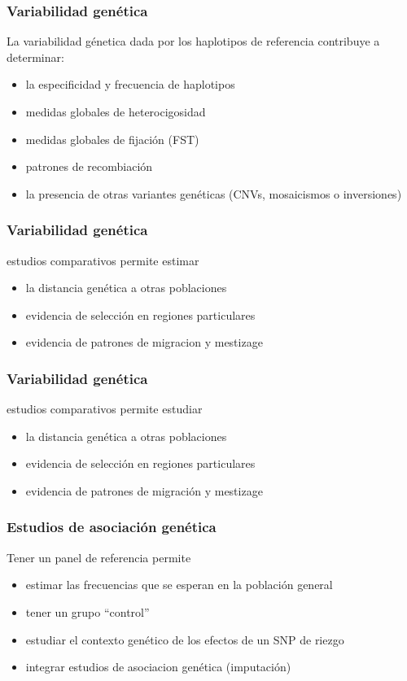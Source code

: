 \documentclass{beamer}\usepackage[]{graphicx}\usepackage[]{color}
\begin{document}
\begin{frame}[fragile]
\frametitle{Variabilidad gen\'etica}

La variabilidad g\'enetica dada por los haplotipos de referencia contribuye a determinar:

\begin{itemize}
\item la especificidad y frecuencia de haplotipos 
\item medidas globales de heterocigosidad 
\item medidas globales de fijaci\'on (FST)
\item patrones de recombiaci\'on
\item la presencia de otras variantes gen\'eticas (CNVs, mosaicismos o inversiones)
\end{itemize}
\end{frame}


\begin{frame}[fragile]
\frametitle{Variabilidad gen\'etica}
estudios comparativos permite estimar
\begin{itemize}
\item la distancia gen\'etica a otras poblaciones 
\item evidencia de selecci\'on en regiones particulares
\item evidencia de patrones de migracion y mestizage
\end{itemize}
\end{frame}


\begin{frame}[fragile]
\frametitle{Variabilidad gen\'etica}
estudios comparativos permite estudiar
\begin{itemize}
\item la distancia gen\'etica a otras poblaciones 
\item evidencia de selecci\'on en regiones particulares
\item evidencia de patrones de migraci\'on y mestizage
\end{itemize}
\end{frame}



\begin{frame}[fragile]
\frametitle{Estudios de asociaci\'on gen\'etica}
Tener un panel de referencia permite
\begin{itemize}
\item estimar las frecuencias que se esperan en la poblaci\'on general 
\item tener un grupo ``control''
\item estudiar el contexto gen\'etico de los efectos de un SNP de riezgo
\item integrar estudios de asociacion gen\'etica (imputaci\'on)
\end{itemize}
\end{frame}
\end{document}
